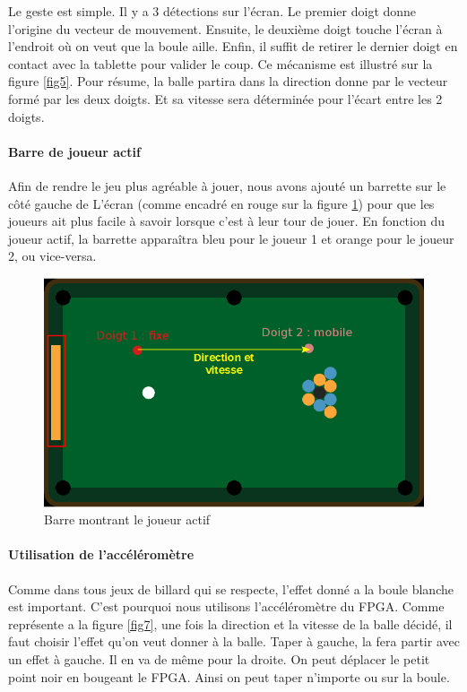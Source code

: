 Le geste est simple. Il y a 3 détections sur l'écran. Le premier doigt donne l'origine du vecteur de mouvement. Ensuite, le deuxième doigt touche l'écran à l'endroit où on veut que la boule  aille. Enfin, il suffit de retirer le dernier doigt en contact avec la tablette pour valider le coup. Ce mécanisme est illustré sur la figure \ref{fig5}. Pour résume, la balle partira dans la direction donne par le vecteur formé par les deux doigts. Et sa vitesse sera déterminée pour l'écart entre les 2 doigts.


\paragraph{Barre de joueur actif}

Afin de rendre le jeu plus agréable à jouer, nous avons ajouté un barrette sur le côté gauche de L’écran (comme encadré en rouge sur la figure \ref{fig6}) pour que les joueurs ait plus facile à savoir lorsque c'est à leur tour de jouer. En fonction du joueur actif, la barrette apparaîtra bleu pour le joueur 1 et orange pour le joueur 2, ou vice-versa.


\begin{figure}[!ht]
\centering
\includegraphics[scale=0.6]{img/barre.png}
\caption{Barre montrant le joueur actif}
\label{fig6}
\end{figure}

\paragraph{Utilisation de l'accéléromètre}

Comme dans tous jeux de billard qui se respecte, l'effet donné a la boule blanche est important. C'est pourquoi nous utilisons l'accéléromètre du FPGA. Comme représente a la figure \ref{fig7}, une fois la direction et la vitesse de la balle décidé, il faut choisir l'effet qu'on veut donner à la balle. Taper à gauche, la fera partir avec un effet à gauche. Il en va de même pour la droite. On peut déplacer le petit point noir en bougeant le FPGA. Ainsi on peut taper n'importe ou sur la boule.

